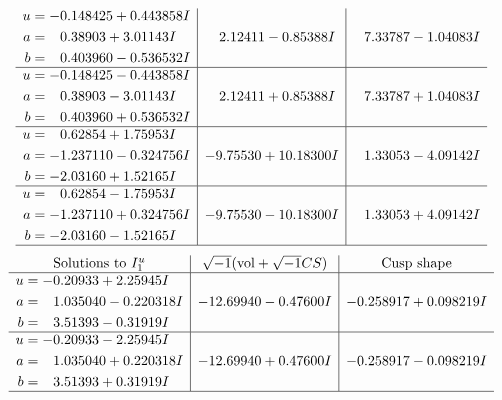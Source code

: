 \documentclass[1p]{elsarticle_modified}
\theoremstyle{definition}
\newcommand{\I}{\sqrt{-1}}
\begin{document}
$$\begin{array}{c|c|c}
\begin{aligned}
u &= -0.148425 + 0.443858 I \\
a &= \phantom{-}0.38903 + 3.01143 I \\
b &= \phantom{-}0.403960 - 0.536532 I\end{aligned}
 & \phantom{-}2.12411 - 0.85388 I & \phantom{-}7.33787 - 1.04083 I \\ \hline\begin{aligned}
u &= -0.148425 - 0.443858 I \\
a &= \phantom{-}0.38903 - 3.01143 I \\
b &= \phantom{-}0.403960 + 0.536532 I\end{aligned}
 & \phantom{-}2.12411 + 0.85388 I & \phantom{-}7.33787 + 1.04083 I \\ \hline\begin{aligned}
u &= \phantom{-}0.62854 + 1.75953 I \\
a &= -1.237110 - 0.324756 I \\
b &= -2.03160 + 1.52165 I\end{aligned}
 & -9.75530 + 10.18300 I & \phantom{-}1.33053 - 4.09142 I \\ \hline\begin{aligned}
u &= \phantom{-}0.62854 - 1.75953 I \\
a &= -1.237110 + 0.324756 I \\
b &= -2.03160 - 1.52165 I\end{aligned}
 & -9.75530 - 10.18300 I & \phantom{-}1.33053 + 4.09142 I\\
 \hline 
 \end{array}$$\newpage$$\begin{array}{c|c|c}  
\text{Solutions to }I^u_{1}& \I (\text{vol} + \sqrt{-1}CS) & \text{Cusp shape}\\
 \hline 
\begin{aligned}
u &= -0.20933 + 2.25945 I \\
a &= \phantom{-}1.035040 - 0.220318 I \\
b &= \phantom{-}3.51393 - 0.31919 I\end{aligned}
 & -12.69940 - 0.47600 I & -0.258917 + 0.098219 I \\ \hline\begin{aligned}
u &= -0.20933 - 2.25945 I \\
a &= \phantom{-}1.035040 + 0.220318 I \\
b &= \phantom{-}3.51393 + 0.31919 I\end{aligned}
 & -12.69940 + 0.47600 I & -0.258917 - 0.098219 I\\
 \hline 
 \end{array}$$\newpage\newpage\renewcommand{\arraystretch}{1}
\end{document}

